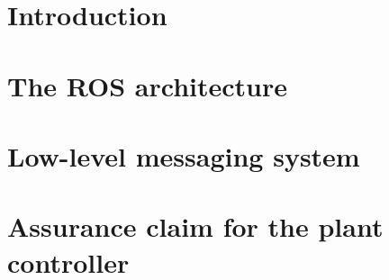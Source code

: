 \documentclass[12pt,a4paper]{article}
\begin{document}
\section{Introduction}


\newpage

\section{The ROS architecture}


\section{Low-level messaging system}



\section{Assurance claim for the plant controller}


%




\end{document}
